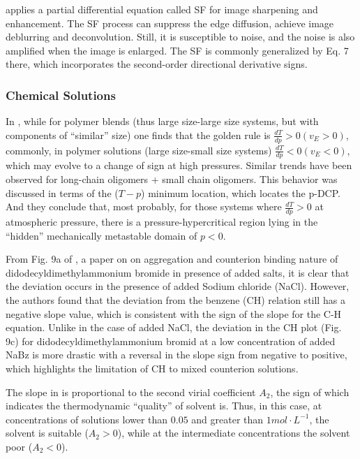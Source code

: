 \documentclass[11pt]{book}
\begin{document}
\cite{correyero2020physics} applies a partial differential equation
called SF for image sharpening and enhancement. The SF process can
suppress the edge diffusion, achieve image deblurring and deconvolution.
Still, it is susceptible to noise, and the noise is also amplified
when the image is enlarged. The SF is commonly generalized by Eq.
7 there, which incorporates the second-order directional derivative
signs.


\subsubsection{Chemical Solutions}

In \cite{rebelo2002double}, while for polymer blends (thus large
size-large size systems, but with components of ``similar'' size)
one finds that the golden rule is $\frac{dT}{dp}>0\left(v_{E}>0\right)$,
commonly, in polymer solutions (large size-small size systems) $\frac{dT}{dp}<0\left(v_{E}<0\right)$,
which may evolve to a change of sign at high pressures. Similar trends
have been observed for long-chain oligomers + small chain oligomers.
This behavior was discussed in terms of the ($T-p$) minimum location,
which locates the p-DCP. And they conclude that, most probably, for
those systems where $\frac{dT}{dp}>0$ at atmospheric pressure, there
is a pressure-hypercritical region lying in the ``hidden'' mechanically
metastable domain of $p<0$.

From Fig. 9a of \cite{thapa2020studies}, a paper on on aggregation and
counterion binding nature of didodecyldimethylammonium bromide in presence of added
salts, it is clear that the deviation
occurs in the presence of added Sodium chloride (NaCl). However, the authors found
that the deviation from the benzene (CH) relation still has a negative slope
value, which is consistent with the sign of the slope for the C-H
equation. Unlike in the case of added NaCl, the deviation in the CH
plot (Fig. 9c) for didodecyldimethylammonium bromid at a low concentration of added NaBz
is more drastic with a reversal in the slope sign from negative to
positive, which highlights the limitation of CH to mixed counterion
solutions.

The slope in \cite{orlovapolarimetry} is proportional to the second
virial coefficient $A_{2}$, the sign of which indicates the thermodynamic
``quality'' of solvent is. Thus, in this case, at concentrations
of solutions lower than $0.05$ and greater than $1mol\cdot L^{-1}$,
the solvent is suitable ($A_{2}>0$), while at the intermediate concentrations
the solvent poor ($A_{2}<0$).
\end{document}
